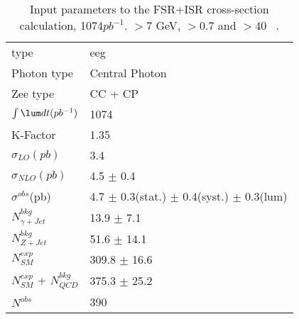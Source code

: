 \documentclass[12pt,twoside,letterpaper]{article}
\begin{document}
   \begin{table}[!hbtp]                                                 
      \begin{center}                                                    
      \begin{tabular}{|l|l|}\hline \hline                         
 	   \Zg type       &eeg           \\ 
       Photon type        &  Central Photon           \\ 
       Zee type        &  CC + CP           \\ 
   \hline 
 	   $\int \lum dt(pb^{-1})$         & 1074          \\ 
   	   K-Factor                   & 1.35                 \\ 
   	   $\sigma_{LO}(pb)$         & 3.4           \\ 
 	   $\sigma_{NLO}(pb)$        & 4.5 $\pm$ 0.4                  \\ 
   \hline 
 $\sigma^{obs}$(pb)  &   4.7 $\pm$ 0.3(stat.)  $\pm$ 0.4(syst.)  $\pm$ 0.3(lum)   \\ 
   \hline 
   \hline 
 $N^{bkg}_{\gamma+Jet}$     &           13.9 $\pm$ 7.1\\ 
  $N^{bkg}_{Z+Jet}$     &           51.6 $\pm$ 14.1\\ 
          $N^{exp}_{SM}$&          309.8 $\pm$ 16.6\\ 
 $N^{exp}_{SM}$ + $N^{bkg}_{QCD}$     &          375.3 $\pm$ 25.2\\ 
   \hline 
               $N^{obs}$&            390\\ 
	 \hline\hline                                                                
      \end{tabular}                                                             
      \end{center}                                                              
      \caption{Input parameters to the FSR+ISR \eeg  cross-section calculation, 1074$pb^{-1}$. \Etg $> 7$ GeV, \DeltaR $> 0.7$ and \Mee $> 40$ \GeVCC~. }  
      \label{Table:eegAcceptanceeeg1fb}                                                        
   \end{table}                                                                  
\end{document}
